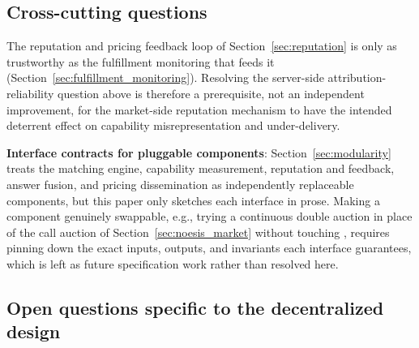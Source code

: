 \subsection{Cross-cutting questions}
\label{sec:open_questions_cross}

The reputation and pricing feedback loop of Section~\ref{sec:reputation}
is only as trustworthy as the fulfillment monitoring that feeds it
(Section~\ref{sec:fulfillment_monitoring}). Resolving the server-side
attribution-reliability question above is therefore a prerequisite, not
an independent improvement, for the market-side reputation mechanism to
have the intended deterrent effect on capability misrepresentation and
under-delivery.

\textbf{Interface contracts for pluggable components}: Section~\ref{sec:modularity}
treats the matching engine, capability measurement, reputation and
feedback, answer fusion, and pricing dissemination as independently
replaceable components, but this paper only sketches each interface in
prose. Making a component genuinely swappable, e.g., trying a continuous
double auction in place of the call auction of Section~\ref{sec:noesis_market}
without touching \NoesisServer{}, requires pinning down the exact inputs,
outputs, and invariants each interface guarantees, which is left as
future specification work rather than resolved here.

\subsection{Open questions specific to the decentralized design}
\label{sec:decentralized_open_questions}

